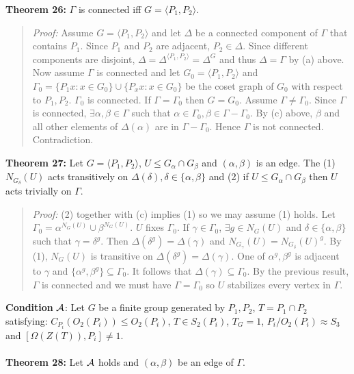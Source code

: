 {\bf Theorem 26:}
$\Gamma$ is connected iff $G= \langle P_1 , P_2 \rangle $.
\begin{quote}
\emph{Proof:}  
Assume $G= \langle P_1 , P_2 \rangle$ and let $\Delta$ be a connected component of $\Gamma$ that contains
$P_1$.  Since $P_1$ and $P_2$ are adjacent, $P_2 \in \Delta$.  Since different components are disjoint,
$\Delta = \Delta^{\langle P_1, P_2 \rangle}= \Delta^G$ and thus $\Delta= \Gamma$ by (a) above.
Now assume $\Gamma$ is connected and let $G_0= \langle P_1, P_2 \rangle$ and $\Gamma_0= 
\{ P_1x: x \in G_0 \} \cup \{ P_xx: x \in G_0 \} $ be the coset graph of $G_0$ with respect to
$P_1, P_2$.  $\Gamma_0$ is connected.  If $\Gamma= \Gamma_0$ then $G= G_0$.  Assume $\Gamma \neq \Gamma_0$.
Since $\Gamma$ is connected, $\exists \alpha, \beta \in \Gamma$ such that $\alpha \in \Gamma_0, \beta \in \Gamma
- \Gamma_0$.  By (c) above, $\beta$ and all other elements of $\Delta( \alpha )$ are in $\Gamma - \Gamma_0$.
Hence $\Gamma$ is not connected.  Contradiction.
\end{quote}
{\bf Theorem 27:}
Let $G= \langle P_1, P_2 \rangle $, $U \le G_{\alpha} \cap G_{\beta}$ and
$(\alpha, \beta)$ is an edge.  The (1) $N_{G_{\delta}}(U)$ acts transitively on
$\Delta(\delta), \delta \in \{ \alpha , \beta \}$ and (2) if $U \le G_{\alpha} \cap G_{\beta}$ then
$U$ acts trivially on $\Gamma$.
\begin{quote}
\emph{Proof:}  
(2) together with (c) implies (1) so we may assume (1) holds.
Let $\Gamma_0= \alpha^{N_G(U)} \cup \beta^{N_G(U)}$.  $U$ fixes $\Gamma_0$.
If $\gamma \in \Gamma_0$, $\exists g \in N_G(U)$ and $\delta \in \{ \alpha, \beta \}$ such that
$\gamma= \delta^g$.  Then $\Delta( \delta^g ) = \Delta ( \gamma )$ and 
$N_{G_{\gamma}}(U)= N_{G_{\delta}}(U)^g $.  By (1), $N_G(U)$ is transitive on $\Delta( \delta^g ) = \Delta( \gamma )$.
One of $\alpha^g, \beta^g$ is adjacent to $\gamma$ and $\{ \alpha^g , \beta^g \} \subseteq \Gamma_0$.
It follows that $\Delta( \gamma ) \subseteq \Gamma_0$.  By the previous result, $\Gamma$ is connected
and we must have $\Gamma= \Gamma_0$ so $U$ stabilizes every vertex in $\Gamma$.
\end{quote}
{\bf Condition} ${\cal A}$:  Let $G$ be a
finite group generated by $P_1, P_2$,
$T= P_1 \cap P_2$ satisfying: $C_{P_i}(O_2(P_i)) \le O_2(P_i)$, $T \in S_2(P_i)$,
$T_G=1$, $P_i/O_2(P_i) \approx S_3$ and $[\Omega(Z(T)), P_i] \ne 1$.
\\
\\
{\bf Theorem 28:}
Let ${\cal A}$ holds and $(\alpha, \beta)$ be an edge of $\Gamma$.
